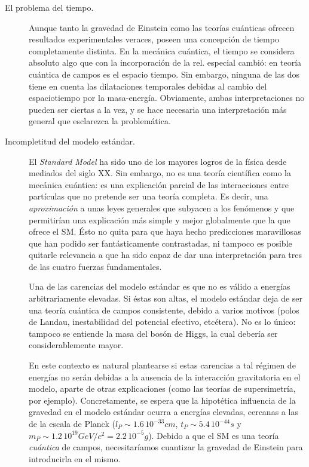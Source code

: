 \documentclass[11pt,a4paper,titlepage]{article}
\begin{document}
\begin{description}
  \item[El problema del tiempo.]{Aunque tanto la gravedad de Einstein como las teorías cuánticas ofrecen resultados experimentales veraces, poseen una concepción de tiempo completamente distinta. En la mecánica cuántica, el tiempo se considera absoluto algo que con la incorporación de la rel. especial cambió: en teoría cuántica de campos es el espacio tiempo. Sin embargo, ninguna de las dos tiene en cuenta las dilataciones temporales debidas al cambio del espaciotiempo por la masa-energía. Obviamente, ambas interpretaciones no pueden ser ciertas a la vez, y se hace necesaria una interpretación más general que esclarezca la problemática.}
  \item[Incompletitud del modelo estándar.]{El \textit{Standard Model} ha sido uno de los mayores logros de la física desde mediados del siglo XX. Sin embargo, no es una teoría científica como la mecánica cuántica: es una explicación parcial de las interacciones entre partículas que no pretende ser una teoría completa. Es decir, una \textit{aproximación} a unas leyes generales que subyacen a los fenómenos y que permitirían una explicación más simple y mejor globalmente que la que ofrece el SM. Ésto no quita para que haya hecho predicciones maravillosas que han podido ser fantásticamente contrastadas, ni tampoco es posible quitarle relevancia a que ha sido capaz de dar una interpretación para tres de las cuatro fuerzas fundamentales.
  \par Una de las carencias del modelo estándar es que no es válido a energías arbitrariamente elevadas. Si éstas son altas, el modelo estándar deja de ser una teoría cuántica de campos consistente, debido a varios motivos (polos de Landau, inestabilidad del potencial efectivo, etcétera). No es lo único: tampoco se entiende la masa del bosón de Higgs, la cual debería ser considerablemente mayor.
  \par En este contexto es natural plantearse si estas carencias a tal régimen de energías no serán debidas a la ausencia de la interacción gravitatoria en el modelo, aparte de otras explicaciones (como las teorías de supersimetría, por ejemplo). Concretamente, se espera que la hipotética influencia de la gravedad en el modelo estándar ocurra a energías elevadas, cercanas a las de la escala de Planck ($l_P\sim1.6\,10^{-33}cm$, $t_P\sim5.4\,10^{-44}s$ y $m_P\sim1.2\,10^{19}GeV/c^2=2.2\,10^{-5}g$). Debido a que el SM es una teoría \textit{cuántica} de campos, necesitaríamos cuantizar la gravedad de Einstein para introducirla en el mismo.
}
\end{description}
\end{document}
